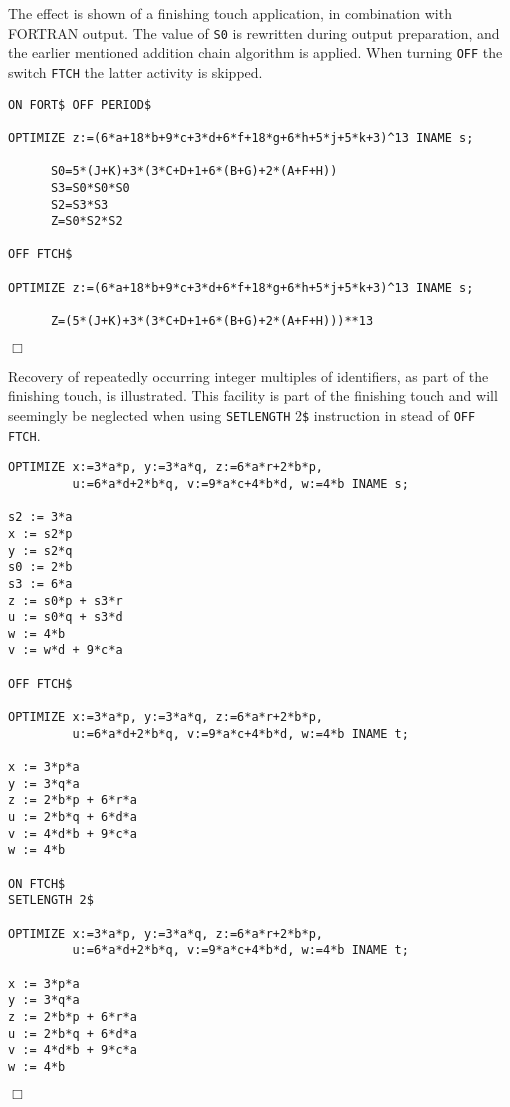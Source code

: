 The effect is shown of a finishing touch application, in combination
with FORTRAN output. The value of {\tt S0} is rewritten during output
preparation, and the earlier mentioned addition chain algorithm is applied.
When turning {\tt OFF} the switch {\tt FTCH} the latter activity is skipped.
{\small
\begin{verbatim}
ON FORT$ OFF PERIOD$

OPTIMIZE z:=(6*a+18*b+9*c+3*d+6*f+18*g+6*h+5*j+5*k+3)^13 INAME s;

      S0=5*(J+K)+3*(3*C+D+1+6*(B+G)+2*(A+F+H))
      S3=S0*S0*S0
      S2=S3*S3
      Z=S0*S2*S2

OFF FTCH$

OPTIMIZE z:=(6*a+18*b+9*c+3*d+6*f+18*g+6*h+5*j+5*k+3)^13 INAME s;

      Z=(5*(J+K)+3*(3*C+D+1+6*(B+G)+2*(A+F+H)))**13
\end{verbatim}
\begin{flushright}
$\Box$
\end{flushright}}
\example\label{ex:3.1.5}

Recovery of repeatedly occurring integer multiples of identifiers,
as part of the finishing touch, is illustrated. This facility is
part of the finishing touch and will seemingly be neglected when
using {\tt SETLENGTH} 2\verb+$+ instruction in stead of {\tt OFF FTCH}.
{\small
\begin{verbatim}
OPTIMIZE x:=3*a*p, y:=3*a*q, z:=6*a*r+2*b*p,
         u:=6*a*d+2*b*q, v:=9*a*c+4*b*d, w:=4*b INAME s;

s2 := 3*a
x := s2*p
y := s2*q
s0 := 2*b
s3 := 6*a
z := s0*p + s3*r
u := s0*q + s3*d
w := 4*b
v := w*d + 9*c*a

OFF FTCH$

OPTIMIZE x:=3*a*p, y:=3*a*q, z:=6*a*r+2*b*p,
         u:=6*a*d+2*b*q, v:=9*a*c+4*b*d, w:=4*b INAME t;

x := 3*p*a
y := 3*q*a
z := 2*b*p + 6*r*a
u := 2*b*q + 6*d*a
v := 4*d*b + 9*c*a
w := 4*b

ON FTCH$
SETLENGTH 2$

OPTIMIZE x:=3*a*p, y:=3*a*q, z:=6*a*r+2*b*p,
         u:=6*a*d+2*b*q, v:=9*a*c+4*b*d, w:=4*b INAME t;

x := 3*p*a
y := 3*q*a
z := 2*b*p + 6*r*a
u := 2*b*q + 6*d*a
v := 4*d*b + 9*c*a
w := 4*b
\end{verbatim}
\begin{flushright}
$\Box$
\end{flushright}}
\example\label{ex:3.1.6}

